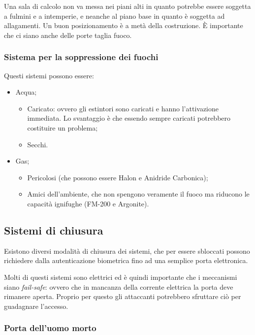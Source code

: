 Una sala di calcolo non va messa nei piani alti in quanto potrebbe essere 
soggetta a fulmini e a intemperie, e neanche al piano base in quanto è soggetta 
ad allagamenti. Un buon posizionamento è a metà della costruzione. È 
importante che ci siano anche delle porte taglia fuoco.

\subsubsection{Sistema per la soppressione dei fuochi}

Questi sistemi possono essere:
\begin{itemize}
\item Acqua;
\begin{itemize}
\item Caricato: ovvero gli estintori sono caricati e hanno l'attivazione 
immediata. Lo svantaggio è che essendo sempre caricati potrebbero costituire un 
problema;
\item Secchi.
\end{itemize}
\item Gas;
\begin{itemize}
\item Pericolosi (che possono essere Halon e Anidride Carbonica);
\item Amici dell'ambiente, che non spengono veramente il fuoco ma riducono le 
capacità ignifughe (FM-200 e Argonite).
\end{itemize}
\end{itemize}

\subsection{Sistemi di chiusura}

Esistono diversi modalità di chiusura dei sistemi, che per essere sbloccati 
possono richiedere dalla autenticazione biometrica fino ad una semplice 
porta elettronica.

Molti di questi sistemi sono elettrici ed è quindi importante che i 
meccanismi siano \textit{fail-safe}: ovvero che in mancanza della corrente 
elettrica la porta deve rimanere aperta. Proprio per questo gli attaccanti 
potrebbero sfruttare ciò per guadagnare l'accesso.

\subsubsection{Porta dell'uomo morto}

